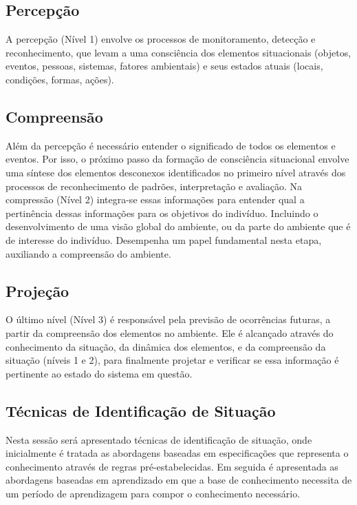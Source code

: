 \documentclass[12pt,a4paper,compsoc]{IEEEtran}
\begin{document}
\subsection{Percepção}

  A percepção (Nível 1)  envolve os processos de monitoramento, detecção e reconhecimento, que
  levam a uma consciência dos elementos situacionais (objetos, eventos, pessoas, sistemas, fatores
  ambientais) e seus estados atuais (locais, condições, formas, ações).


\subsection{Compreensão}

  Além da percepção é necessário entender o significado de todos os elementos e eventos. Por
  isso, o próximo passo da formação de consciência situacional envolve uma síntese dos elementos
  desconexos identificados no primeiro nível através dos processos de reconhecimento de padrões,
  interpretação e avaliação. Na compressão (Nível 2) integra-se essas informações para entender
  qual a pertinência dessas informações para os objetivos do indivíduo. Incluindo o desenvolvimento
  de uma visão global do ambiente, ou da parte do ambiente que é de interesse do indivíduo.
  Desempenha um papel fundamental nesta etapa, auxiliando a compreensão do ambiente.


\subsection{Projeção}

  O último nível (Nível 3)  é responsável pela previsão de ocorrências futuras, a partir da 
  compreensão dos elementos no ambiente. Ele é alcançado através do conhecimento da situação, da
  dinâmica dos elementos, e da compreensão da situação (níveis 1 e 2), para finalmente projetar e
  verificar se essa informação é pertinente ao estado do sistema em questão.


\subsection{Técnicas de Identificação de Situação}

  Nesta sessão será apresentado técnicas de identificação de situação, onde inicialmente é tratada
  as abordagens baseadas em especificações que representa o conhecimento através de regras 
  pré-estabelecidas. Em seguida é apresentada as abordagens baseadas em aprendizado em que a base
  de conhecimento necessita de um período de aprendizagem para compor o conhecimento necessário.
\end{document}
